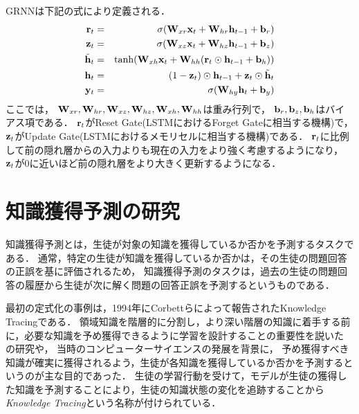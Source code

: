 GRNNは下記の式により定義される．
\begin{eqnarray}
\label{eq:grurnn1}
{\bf r}_t &=& \sigma({\bf W}_{xr}{\bf x}_t + {\bf W}_{hr}{\bf h}_{t-1} + {\bf b}_r)\\
\label{eq:grurnn2}
{\bf z}_t &=& \sigma({\bf W}_{xz}{\bf x}_t + {\bf W}_{hz}{\bf h}_{t-1} + {\bf b}_z)\\
\label{eq:grurnn3}
\tilde{{\bf h}}_t &=& \tanh({\bf W}_{xh}{\bf x}_t + {\bf W}_{hh}({\bf r}_t \odot {\bf h}_{t-1} + {\bf b}_h))\\
\label{eq:grurnn4}
{\bf h}_t &=& (1 - {\bf z}_t) \odot {\bf h}_{t-1} + {\bf z}_t \odot \tilde{{\bf h}}_t\\
\label{eq:grurnn5}
{\bf y}_t &=& \sigma( {\bf W}_{hy} {\bf h}_t + {\bf b}_y)
\end{eqnarray}
ここでは，
${\bf W}_{xr}, {\bf W}_{hr}, {\bf W}_{xz}, {\bf W}_{hz}, {\bf W}_{xh}, {\bf W}_{hh}$は重み行列で， 
${\bf b}_r, {\bf b}_z, {\bf b}_h$はバイアス項である．
${\bf r}_t$がReset Gate(LSTMにおけるForget Gateに相当する機構)で，  
${\bf z}_t$がUpdate Gate(LSTMにおけるメモリセルに相当する機構)である．
${\bf r}_t$に比例して前の隠れ層からの入力よりも現在の入力をより強く考慮するようになり，
${\bf z}_t$が0に近いほど前の隠れ層をより大きく更新するようになる．






\section{知識獲得予測の研究}
知識獲得予測とは，生徒が対象の知識を獲得しているか否かを予測するタスクである．
通常，特定の生徒が知識を獲得しているか否かは，その生徒の問題回答の正誤を基に評価されるため，
知識獲得予測のタスクは，過去の生徒の問題回答の履歴から生徒が次に解く問題の回答正誤を予測するというものである．

最初の定式化の事例は，1994年にCorbettらによって報告されたKnowledge Tracing\cite{corbett1994knowledge}である．
領域知識を階層的に分割し，より深い階層の知識に着手する前に，必要な知識を予め獲得できるように学習を設計することの重要性を説いた
\cite{keller1968good, bloom1968learning}の研究や，
当時のコンピューターサイエンスの発展を背景に，
予め獲得すべき知識が確実に獲得されるよう，生徒が各知識を獲得しているか否かを予測するというのが主な目的であった．
生徒の学習行動を受けて，モデルが生徒の獲得した知識を予測することにより，生徒の知識状態の変化を追跡することから{\it Knowledge Tracing}という名称が付けられている．


